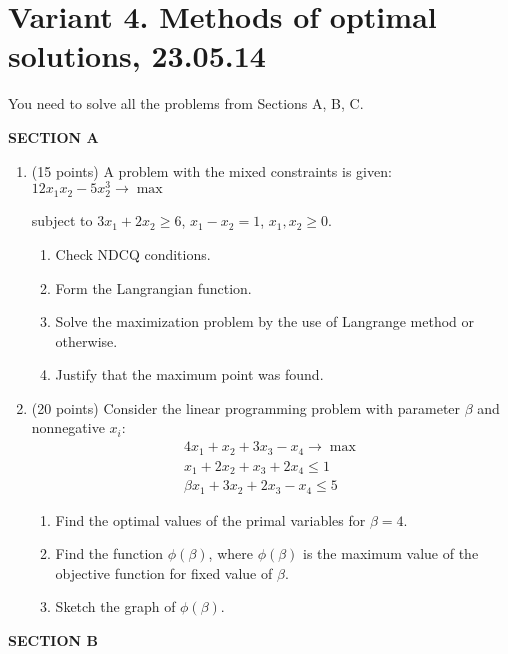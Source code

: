 \documentclass[12pt,a4paper]{article}
\begin{document}
\newpage

\section*{Variant 4. Methods of optimal solutions, 23.05.14}

You need to solve all the problems from Sections A, B, C.

\pagestyle{empty}

\textbf{SECTION A}

\begin{enumerate}
\item (15 points) A problem with the mixed constraints is given: $12x_1 x_2-5x_2^3 \to \max$

subject to $3x_1+2x_2 \geq 6$, $x_1-x_2=1$, $x_1, x_2 \geq 0$.
\begin{enumerate}
\item Check NDCQ conditions.
\item  Form the Langrangian function.
\item Solve the maximization problem by the use of Langrange method or otherwise.
\item Justify that the maximum point was found.
\end{enumerate}
\item  (20 points)   Consider the linear programming problem with parameter $\beta$ and nonnegative $x_i$:
\begin{align*}
4x_1+x_2+3x_3-x_4 \to \max \\
x_1+2x_2+x_3+2x_4\leq 1 \\
\beta x_1+3x_2+2x_3-x_4 \leq 5
\end{align*}

\begin{enumerate}
\item Find the optimal values of the primal variables for $\beta=4$.
\item Find the function $\phi(\beta)$, where $\phi(\beta)$  is the maximum value of the objective function for fixed value of $\beta$.
\item Sketch the graph of $\phi(\beta)$.
\end{enumerate}


\end{enumerate}

\textbf{SECTION B}
\end{document}
